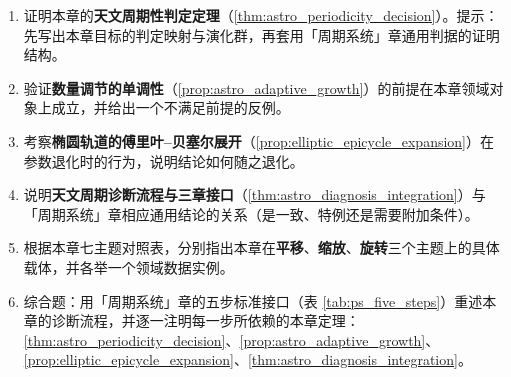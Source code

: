 \begin{enumerate}[leftmargin=3em, label=\textbf{题 \arabic*}]
    \item 证明本章的\textbf{天文周期性判定定理}（\ref{thm:astro_periodicity_decision}）。提示：先写出本章目标的判定映射与演化群，再套用「周期系统」章通用判据的证明结构。

    \item 验证\textbf{数量调节的单调性}（\ref{prop:astro_adaptive_growth}）的前提在本章领域对象上成立，并给出一个不满足前提的反例。

    \item 考察\textbf{椭圆轨道的傅里叶--贝塞尔展开}（\ref{prop:elliptic_epicycle_expansion}）在参数退化时的行为，说明结论如何随之退化。

    \item 说明\textbf{天文周期诊断流程与三章接口}（\ref{thm:astro_diagnosis_integration}）与「周期系统」章相应通用结论的关系（是一致、特例还是需要附加条件）。

    \item 根据本章七主题对照表，分别指出本章在\textbf{平移}、\textbf{缩放}、\textbf{旋转}三个主题上的具体载体，并各举一个领域数据实例。

    \item 综合题：用「周期系统」章的五步标准接口（表 \ref{tab:ps_five_steps}）重述本章的诊断流程，并逐一注明每一步所依赖的本章定理：\ref{thm:astro_periodicity_decision}、\ref{prop:astro_adaptive_growth}、\ref{prop:elliptic_epicycle_expansion}、\ref{thm:astro_diagnosis_integration}。
\end{enumerate}


